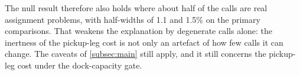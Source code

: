 The null result therefore also holds where about half of the calls are real
assignment problems, with half-widths of 1.1 and 1.5\% on the primary comparisons. That
weakens the explanation by degenerate calls alone: the inertness of the
pickup-leg cost is not only an artefact of how few calls it can change. The caveats of
\cref{subsec:main} still apply, and it still concerns the pickup-leg cost under the
dock-capacity gate.
